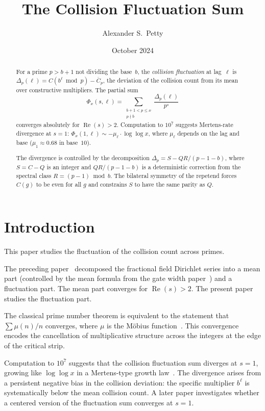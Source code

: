 \documentclass[12pt]{amsart}
\title{The Collision Fluctuation Sum}
\author{Alexander S.\ Petty}
\date{October 2024}
\theoremstyle{definition}
\theoremstyle{remark}
\begin{document}
\begin{abstract}
For a prime $p > b + 1$ not dividing the base~$b$, the
\emph{collision fluctuation} at lag~$\ell$ is
$\Delta_p(\ell) = C(b^{\ell} \bmod p) - \overline{C}_p$,
the deviation of the collision count from its mean over
constructive multipliers. The partial sum
\[
\Phi_x(s, \ell) = \sum_{\substack{b+1 < p \le x \\ p \nmid b}}
\frac{\Delta_p(\ell)}{p^s}
\]
converges absolutely for $\operatorname{Re}(s) > 2$.
Computation to $10^7$ suggests Mertens-rate divergence at
$s = 1$: $\Phi_x(1, \ell) \sim -\mu_{\ell} \cdot \log\log x$,
where $\mu_{\ell}$ depends on the lag and base
($\mu_1 \approx 0.68$ in base~$10$).

The divergence is controlled by the decomposition
$\Delta_p = S - QR/(p{-}1{-}b)$, where $S = C - Q$ is an
integer and $QR/(p{-}1{-}b)$ is a deterministic
correction from the spectral class $R = (p{-}1) \bmod b$.
The bilateral symmetry of the repetend forces $C(g)$ to be
even for all $g$ and constrains $S$ to have the same parity
as $Q$.
\end{abstract}
\maketitle

\section{Introduction}

This paper studies the fluctuation of the collision count across primes.

The preceding paper~\cite{paper12} decomposed the fractional
field Dirichlet series into a mean part
(controlled by the mean formula from the gate width
paper~\cite{paper11}) and a fluctuation part. The mean part
converges for $\operatorname{Re}(s) > 2$. The present paper
studies the fluctuation part.

The classical prime number theorem is equivalent to the
statement that $\sum \mu(n)/n$ converges, where $\mu$ is the
M\"obius function~\cite{davenport,hardy}. This convergence
encodes the cancellation of multiplicative structure across the
integers at the edge of the critical strip.

Computation to $10^7$ suggests that the collision fluctuation
sum diverges at $s = 1$, growing like $\log\log x$ in a
Mertens-type growth law~\cite{mertens}. The divergence arises
from a persistent negative bias in the collision deviation: the
specific multiplier $b^{\ell}$ is systematically below the mean
collision count. A later paper investigates whether a centered
version of the fluctuation sum converges at $s = 1$.
\end{document}
